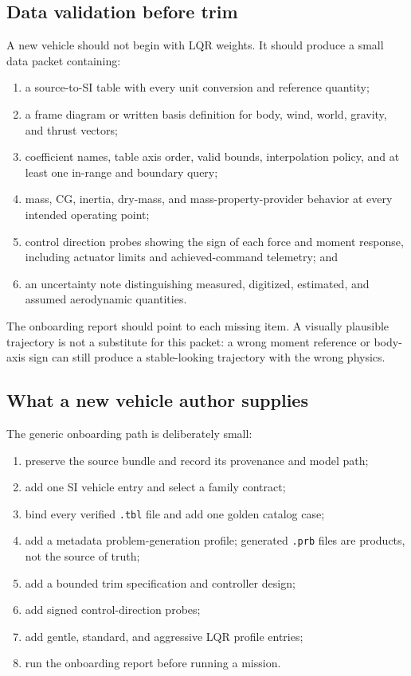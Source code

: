 \documentclass[11pt]{article}
\begin{document}
\subsection{Data validation before trim}

A new vehicle should not begin with LQR weights. It should produce a small
data packet containing:

\begin{enumerate}
  \item a source-to-SI table with every unit conversion and reference quantity;
  \item a frame diagram or written basis definition for body, wind, world,
    gravity, and thrust vectors;
  \item coefficient names, table axis order, valid bounds, interpolation policy,
    and at least one in-range and boundary query;
  \item mass, CG, inertia, dry-mass, and mass-property-provider behavior at
    every intended operating point;
  \item control direction probes showing the sign of each force and moment
    response, including actuator limits and achieved-command telemetry; and
  \item an uncertainty note distinguishing measured, digitized, estimated, and
    assumed aerodynamic quantities.
\end{enumerate}

The onboarding report should point to each missing item. A visually plausible
trajectory is not a substitute for this packet: a wrong moment reference or
body-axis sign can still produce a stable-looking trajectory with the wrong
physics.

\subsection{What a new vehicle author supplies}

The generic onboarding path is deliberately small:

\begin{enumerate}
  \item preserve the source bundle and record its provenance and model path;
  \item add one SI vehicle entry and select a family contract;
  \item bind every verified \texttt{.tbl} file and add one golden catalog case;
  \item add a metadata problem-generation profile; generated \texttt{.prb}
    files are products, not the source of truth;
  \item add a bounded trim specification and controller design;
  \item add signed control-direction probes;
  \item add gentle, standard, and aggressive LQR profile entries;
  \item run the onboarding report before running a mission.
\end{enumerate}
\end{document}
